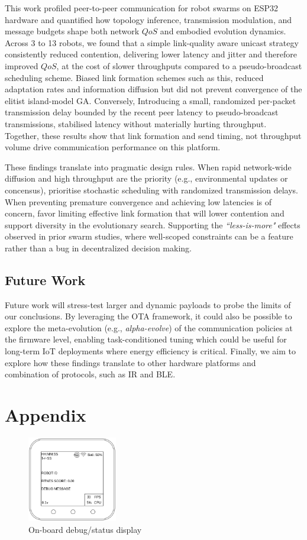 \documentclass[conference]{IEEEtran}
\begin{document}
This work profiled peer-to-peer communication for robot swarms on ESP32 hardware and quantified how topology inference, transmission modulation, and message budgets shape both network $QoS$ and embodied evolution dynamics. Across 3 to 13 robots, we found that a simple link-quality aware unicast strategy consistently reduced contention, delivering lower latency and jitter and therefore improved $QoS$, at the cost of slower throughputs compared to a pseudo-broadcast scheduling scheme. Biased link formation schemes such as this, reduced adaptation rates and information diffusion but did not prevent convergence of the elitist island-model GA. Conversely, Introducing a small, randomized per-packet transmission delay bounded by the recent peer latency to pseudo-broadcast transmissions, stabilised latency without materially hurting throughput. Together, these results show that link formation and send timing, not throughput volume drive communication performance on this platform. 

These findings translate into pragmatic design rules. When rapid network-wide diffusion and high throughput are the priority (e.g., environmental updates or concensus), prioritise stochastic scheduling with randomized transmission delays. When preventing premature convergence and achieving low latencies is of concern, favor limiting effective link formation that will lower contention and support diversity in the evolutionary search. Supporting the \emph{“less-is-more"} effects observed in prior swarm studies, where well-scoped constraints can be a feature rather than a bug in decentralized decision making.

\subsection{Future Work}

Future work will stress-test larger and dynamic payloads to probe the limits of our conclusions. By leveraging the OTA framework, it could also be possible to explore the meta-evolution (e.g., \emph{alpha-evolve}) of the communication policies at the firmware level, enabling task-conditioned tuning which could be useful for long-term IoT deployments where energy efficiency is critical. Finally, we aim to explore how these findings translate to other hardware platforms and combination of protocols, such as IR and BLE.

\printbibliography
\section{Appendix}
\begin{figure}[H]
    \centering
    \includegraphics[width=0.35\textwidth]{UI.png}
    \caption{On-board debug/status display}
    \label{fig:UI}
\end{figure}
\end{document}
